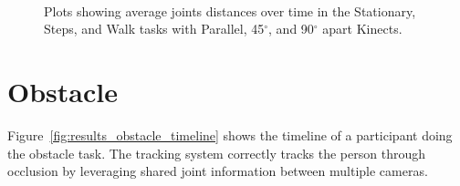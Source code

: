 \begin{figure}[!h]
{  } \\

  \caption{Plots showing average joints distances over time in the Stationary, Steps, and Walk tasks with Parallel, 45$^{\circ}$, and 90$^{\circ}$ apart Kinects.}

  \label{fig:results_three_joints_over_time}
\end{figure}

\section{Obstacle}
\label{sec:results_obstacle}

Figure~\ref{fig:results_obstacle_timeline} shows the timeline of a participant doing the obstacle task. The tracking system correctly tracks the person through occlusion by leveraging shared joint information between multiple cameras.


